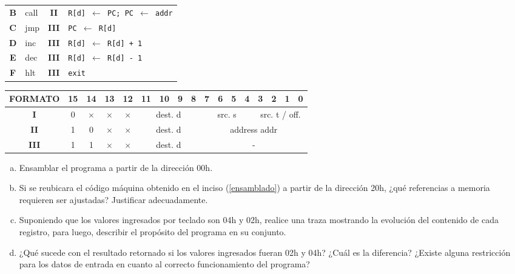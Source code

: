 \documentclass[12pt,a4paper]{article}
\begin{document}
\begin{small}
\begin{minipage}{.6\textwidth}
\begin{tabular}{|c|l|c|l|}
			\textbf{B} & \textsf{call}  & \textbf{II} & \texttt{R[d] $\leftarrow$ PC; PC $\leftarrow$ addr} \\
			\textbf{C} & \textsf{jmp}   & \textbf{III} & \texttt{PC $\leftarrow$ R[d]} \\
			\textbf{D} & \textsf{inc}   & \textbf{III} & \texttt{R[d] $\leftarrow$ R[d] + 1} \\
			\textbf{E} & \textsf{dec}   & \textbf{III} & \texttt{R[d] $\leftarrow$ R[d] - 1} \\
			\textbf{F} & \textsf{hlt}   & \textbf{III} & \texttt{exit} \\ \hline
		\end{tabular}	
	\end{minipage}
	\begin{center}
		\begin{tabular}{*{17}{c}}
			\textsf{FORMATO} & 15 & 14 & 13 & 12 & 11 & 10 & 9 & 8 & 7 & 6 & 5 & 4 & 3 & 2 & 1 & 0 \\ \hline
			\multicolumn{1}{|c|}{\textbf{I}} & 0 & $\times$ & $\times$ & $\times$ &
			\multicolumn{4}{|c|}{\textsf{dest. d}} &
			\multicolumn{4}{|c|}{\textsf{src. s}} &
			\multicolumn{4}{|c|}{\textsf{src. t / off.}} \\ \hline
			\multicolumn{1}{|c|}{\textbf{II}} & 1 & 0 & $\times$ & $\times$ &
			\multicolumn{4}{|c|}{\textsf{dest. d}} &
			\multicolumn{8}{|c|}{\textsf{address addr}} \\ \hline
			\multicolumn{1}{|c|}{\textbf{III}} & 1 & 1 & $\times$ & $\times$ &
			\multicolumn{4}{|c|}{\textsf{dest. d}} &
			\multicolumn{8}{|c|}{\textsf{-}} \\ \hline
		\end{tabular}
	\end{center}		
\end{small}
\begin{small}
\begin{enumerate}[a)]
	\item Ensamblar el programa a partir de la dirección 00h. \label{ensamblado}
	\item Si se reubicara el código máquina obtenido en el inciso (\ref{ensamblado}) a partir de la dirección 20h, ¿qué referencias a memoria requieren ser ajustadas? Justificar adecuadamente.
	\item Suponiendo que los valores ingresados por teclado son 04h y 02h, realice una traza mostrando la evolución del contenido de cada registro, para luego, describir el propósito del programa en su conjunto.
	\item ¿Qué sucede con el resultado retornado si los valores ingresados fueran 02h y 04h? ¿Cuál es la diferencia? ¿Existe alguna restricción para los datos de entrada en cuanto al correcto funcionamiento del programa?
\end{enumerate}
\end{small}
\end{document}
